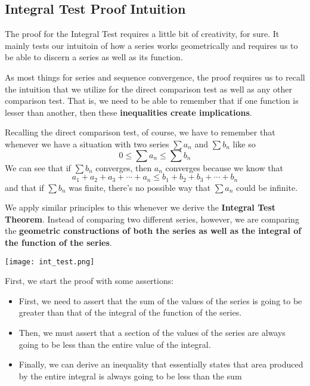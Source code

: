 \documentclass{report}
\begin{document}
\begin{sloppypar}
\subsection{Integral Test Proof Intuition}
The proof for the Integral Test requires a little bit
of creativity, for sure. It mainly tests our intuitoin
of how a series works geometrically and requires us to
be able to discern a series as well as its function.
\par As most things for series and sequence convergence,
the proof requires us to recall the intuition that
we utilize for the direct comparison test as well as
any other comparison test. That is, we need to be able
to remember that if one function is lesser than another,
then these \textbf{inequalities create implications}.
\par Recalling the direct comparison test, of course,
we have to remember that whenever we have a situation
with two series $ \sum a_{n} $ and $ \sum b_{n}$ like so
\[ 0 \leq \sum a_{n} \leq \sum b_{n} \]
We can see that if $ \sum b_{n} $ converges, then $ a_{n} $
converges because we know that
\[ a_{1} + a_{2} + a_{3} + \cdots + a_{n}
  \leq b_{1} + b_{2} + b_{3} + \cdots + b_{n} \]
and that if $ \sum b_{n}$ was finite, there's no possible
way that $ \sum a_{n}$ could be infinite.
\\
\par We apply similar principles to this whenever
we derive the \textbf{Integral Test Theorem}.
Instead of comparing two different series, however,
we are comparing the \textbf{geometric constructions
  of both the series as well as the integral of the
  function of the series}.
\begin{center}
    \texttt{[image: int\_test.png]}
\end{center}
First, we start the proof with some
assertions:
\begin{itemize}
  \item First, we need to assert that the
        sum of the values of the series
        is going to be greater
        than that of the integral of the
        function of the series.
  \item Then, we must assert that a
        section of the values
        of the series are always going to
        be less than the entire value of the integral.
  \item Finally, we can derive
        an inequality that essentially states
        that area produced by
        the entire integral is always
        going to be less than the sum

\end{itemize}
\end{sloppypar}
\end{document}
